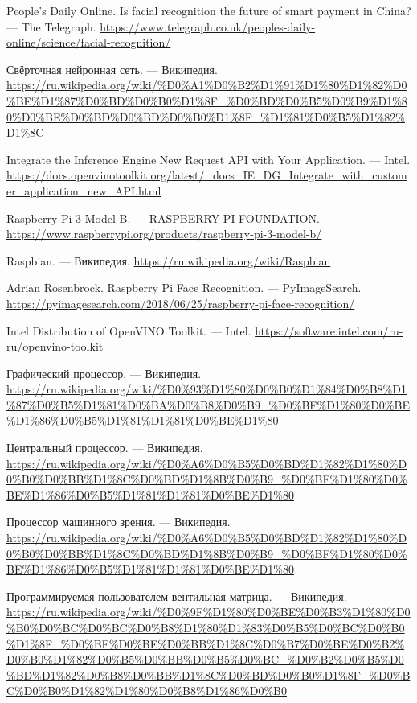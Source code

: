 \documentclass[12pt,a4paper]{scrartcl}
\begin{document}
\begin{thebibliography}{9}
	People's Daily Online. Is facial recognition the future of smart payment in China? 
	\newblock --- The Telegraph. \url{https://www.telegraph.co.uk/peoples-daily-online/science/facial-recognition/}
	
	Свёрточная нейронная сеть. 
	\newblock --- Википедия.
 	\url{https://ru.wikipedia.org/wiki/%D0%A1%D0%B2%D1%91%D1%80%D1%82%D0%BE%D1%87%D0%BD%D0%B0%D1%8F_%D0%BD%D0%B5%D0%B9%D1%80%D0%BE%D0%BD%D0%BD%D0%B0%D1%8F_%D1%81%D0%B5%D1%82%D1%8C}
	
	Integrate the Inference Engine New Request API with Your Application.
	\newblock --- Intel. \url{https://docs.openvinotoolkit.org/latest/_docs_IE_DG_Integrate_with_customer_application_new_API.html}
	
	Raspberry Pi 3 Model B.
	\newblock --- RASPBERRY PI FOUNDATION. \url{https://www.raspberrypi.org/products/raspberry-pi-3-model-b/}
	
	Raspbian.
	\newblock --- Википедия. \url{https://ru.wikipedia.org/wiki/Raspbian}
	
	Adrian Rosenbrock. Raspberry Pi Face Recognition.
	\newblock --- PyImageSearch. \url{https://pyimagesearch.com/2018/06/25/raspberry-pi-face-recognition/}
	
	Intel Distribution of OpenVINO Toolkit.
	\newblock --- Intel. \url{https://software.intel.com/ru-ru/openvino-toolkit}
	
	Графический процессор.
	\newblock --- Википедия. \url{https://ru.wikipedia.org/wiki/%D0%93%D1%80%D0%B0%D1%84%D0%B8%D1%87%D0%B5%D1%81%D0%BA%D0%B8%D0%B9_%D0%BF%D1%80%D0%BE%D1%86%D0%B5%D1%81%D1%81%D0%BE%D1%80}
	
	Центральный процессор.
	\newblock --- Википедия. \url{https://ru.wikipedia.org/wiki/%D0%A6%D0%B5%D0%BD%D1%82%D1%80%D0%B0%D0%BB%D1%8C%D0%BD%D1%8B%D0%B9_%D0%BF%D1%80%D0%BE%D1%86%D0%B5%D1%81%D1%81%D0%BE%D1%80}
		
	Процессор машинного зрения.
	\newblock --- Википедия. \url{https://ru.wikipedia.org/wiki/%D0%A6%D0%B5%D0%BD%D1%82%D1%80%D0%B0%D0%BB%D1%8C%D0%BD%D1%8B%D0%B9_%D0%BF%D1%80%D0%BE%D1%86%D0%B5%D1%81%D1%81%D0%BE%D1%80}
		
	Программируемая пользователем вентильная матрица.
	\newblock --- Википедия. \url{https://ru.wikipedia.org/wiki/%D0%9F%D1%80%D0%BE%D0%B3%D1%80%D0%B0%D0%BC%D0%BC%D0%B8%D1%80%D1%83%D0%B5%D0%BC%D0%B0%D1%8F_%D0%BF%D0%BE%D0%BB%D1%8C%D0%B7%D0%BE%D0%B2%D0%B0%D1%82%D0%B5%D0%BB%D0%B5%D0%BC_%D0%B2%D0%B5%D0%BD%D1%82%D0%B8%D0%BB%D1%8C%D0%BD%D0%B0%D1%8F_%D0%BC%D0%B0%D1%82%D1%80%D0%B8%D1%86%D0%B0}
		

\end{thebibliography}
\end{document}

